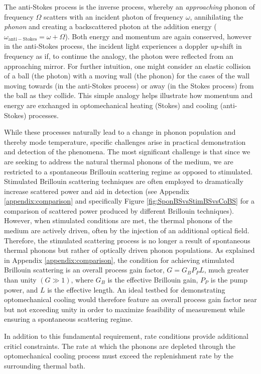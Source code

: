 The anti-Stokes process is the inverse process, whereby an \textit{approaching} phonon of frequency \(\Omega\) scatters with an incident photon of frequency \(\omega\), annihilating the \textit{phonon} and creating a backscattered photon at the addition energy (\(\omega_{\mathrm{anti-Stokes}} = \omega + \Omega\)). Both energy and momentum are again conserved, however in the anti-Stokes process, the incident light experiences a doppler \textit{up}-shift in frequency as if, to continue the analogy, the photon were reflected from an approaching mirror. For further intuition, one might consider an elastic collision of a ball (the photon) with a moving wall (the phonon) for the cases of the wall moving towards (in the anti-Stokes process) or away (in the Stokes process) from the ball as they collide. This simple analogy helps illustrate how momentum and energy are exchanged in optomechanical heating (Stokes) and cooling (anti-Stokes) processes.

While these processes naturally lead to a change in phonon population and thereby mode temperature, specific challenges arise in practical demonstration and detection of the phenomena. The most significant challenge is that since we are seeking to address the natural thermal phonons of the medium, we are restricted to a spontaneous Brillouin scattering regime as opposed to stimulated. Stimulated Brillouin scattering techniques are often employed to dramatically increase scattered power and aid in detection (see Appendix \ref{appendix:comparison} and specifically Figure \ref{fig:SponBSvsStimBSvsCoBS} for a comparison of scattered power produced by different Brillouin techniques). However, when stimulated conditions are met, the thermal phonons of the medium are actively driven, often by the injection of an additional optical field. Therefore, the stimulated scattering process is no longer a result of spontaneous thermal phonons but rather of optically driven phonon populations. As explained in Appendix \ref{appendix:comparison}, the condition for achieving stimulated Brillouin scattering is an overall process gain factor, \(G = G_{B}P_{P}L\), much greater than unity \((G \gg 1)\), where \(G_{B}\) is the effective Brillouin gain, \(P_{P}\) is the pump power, and \(L\) is the effective length. An ideal testbed for demonstrating optomechanical cooling would therefore feature an overall process gain factor near but not exceeding unity in order to maximize feasibility of measurement while ensuring a spontaneous scattering regime.

In addition to this fundamental requirement, rate conditions provide additional criticl constraints. The rate at which the phonons are depleted through the optomechanical cooling process must exceed the replenishment rate by the surrounding thermal bath.

